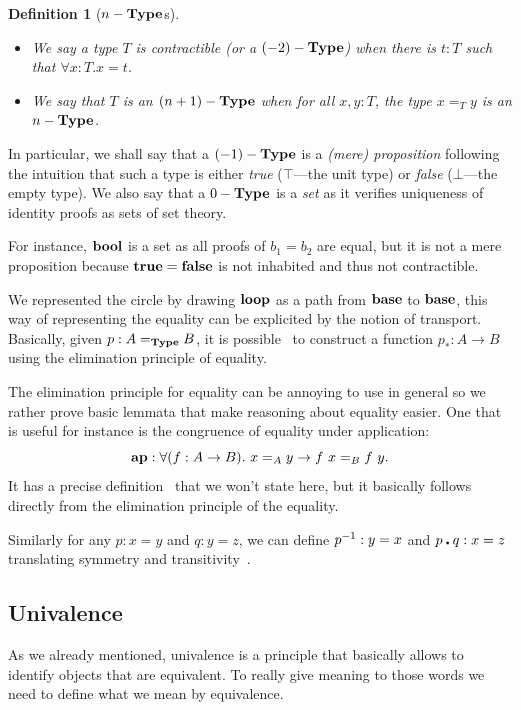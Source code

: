 \documentclass[11pt]{article}
\theoremstyle{plain}
\newtheorem{definition}[theorem]{Definition}
\theoremstyle{remark}
\begin{document}
\begin{definition}[$n-\operatorname{\mathbf{Type}}$s]
  \leavevmode
  \begin{itemize}
    \item We say a type $T$ is \emph{contractible} (or a $(-2)-\operatorname{\mathbf{Type}}$) when
          there is $t : T$ such that $\forall x : T. x = t$.
    \item We say that $T$ is an $(n+1)-\operatorname{\mathbf{Type}}$ when for all $x, y : T$, the type
          $x =_T y$ is an $n-\operatorname{\mathbf{Type}}$.
  \end{itemize}
\end{definition}
%
\noindent
In particular, we shall say that a $(-1)-\operatorname{\mathbf{Type}}$ is a \emph{(mere) proposition}
following the intuition that such a type is either \emph{true} ($\top$---the
unit type) or \emph{false} ($\bot$---the empty type).
We also say that a $0-\operatorname{\mathbf{Type}}$ is a \emph{set} as it verifies uniqueness of
identity proofs as sets of set theory.

For instance, $\operatorname{\mathbf{bool}}$ is a set as all proofs of $b_1 = b_2$ are equal, but it
is not a mere proposition because $\operatorname{\mathbf{true}} = \operatorname{\mathbf{false}}$ is not inhabited and thus
not contractible.

We represented the circle by drawing $\operatorname{\mathbf{loop}}$ as a path from $\operatorname{\mathbf{base}}$ to
$\operatorname{\mathbf{base}}$, this way of representing the equality can be explicited by the notion
of transport.
Basically, given $p : A =_{\operatorname{\mathbf{Type}}} B$, it is possible~ to
construct a function $p_* : A \to B$ using the elimination principle of
equality.

The elimination principle for equality can be annoying to use in general so we
rather prove basic lemmata that make reasoning about equality easier.
One that is useful for instance is the congruence of equality under application:
\[ \operatorname{\mathbf{ap}} : \forall (f : A \to B).\ x =_A y \to f\ x =_B f\ y. \]
\noindent
It has a precise definition~ that we won't state here, but it
basically follows directly from the elimination principle of the equality.

Similarly for any $p : x = y$ and $q : y = z$, we can define
$p^{-1} : y = x$ and $p \centerdot q : x = z$ translating symmetry and
transitivity~.

\subsection{Univalence}

As we already mentioned, univalence is a principle that basically allows to
identify objects that are equivalent. To really give meaning to those words we
need to define what we mean by equivalence.
\end{document}
